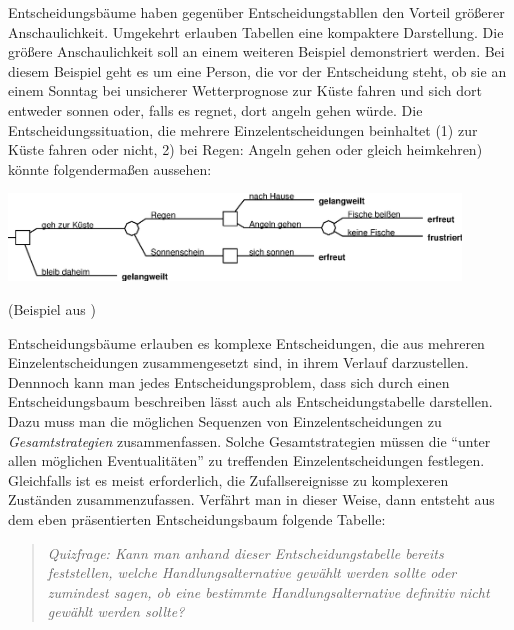 Entscheidungsbäume haben gegenüber Entscheidungstabllen den Vorteil
größerer Anschaulichkeit. Umgekehrt erlauben Tabellen eine kompaktere
Darstellung. Die größere Anschaulichkeit soll an einem weiteren
Beispiel demonstriert werden.  Bei diesem Beispiel geht es um eine
Person, die vor der Entscheidung steht, ob sie an einem Sonntag bei
unsicherer Wetterprognose zur Küste fahren und sich dort entweder
sonnen oder, falls es regnet, dort angeln gehen würde. Die
Entscheidungssituation, die mehrere Einzelentscheidungen beinhaltet
(1) zur Küste fahren oder nicht, 2) bei Regen: Angeln gehen oder
gleich heimkehren) könnte folgendermaßen aussehen:

\begin{center}
\includegraphics[width=12cm]{Grafiken/Beispiel1_2.eps}
\end{center}
(Beispiel aus \cite[S. 18]{resnik:1987})

Entscheidungsbäume erlauben es komplexe Entscheidungen, die aus
mehreren Einzelentscheidungen zusammengesetzt sind, in ihrem Verlauf
darzustellen.  Dennnoch kann man jedes Entscheidungsproblem, dass sich
durch einen Entscheidungsbaum beschreiben lässt auch als
Entscheidungstabelle darstellen.  Dazu muss man die möglichen
Sequenzen von Einzelentscheidungen zu {\em Gesamtstrategien}
zusammenfassen. Solche Gesamtstrategien müssen die "`unter allen
möglichen Eventualitäten"' zu treffenden Einzelentscheidungen
festlegen.  Gleichfalls ist es meist erforderlich, die
Zufallsereignisse zu komplexeren Zuständen zusammenzufassen. Verfährt
man in dieser Weise, dann entsteht aus dem eben präsentierten
Entscheidungsbaum folgende Tabelle:

\begin{center}
\label{AngelnBeispiel}

\end{center}

\begin{quotation}
\begin{small}
{\em Quizfrage: Kann man anhand dieser Entscheidungstabelle 
 bereits feststellen, welche 
Handlungsalternative gewählt werden
sollte oder zumindest sagen, ob eine bestimmte
Handlungsalternative definitiv nicht gewählt werden sollte?}
\end{small}
\end{quotation}

